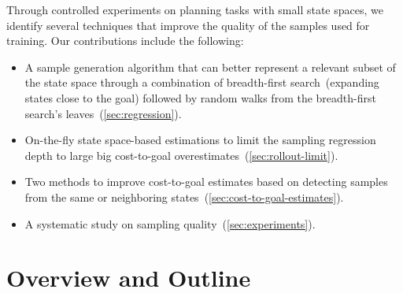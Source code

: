 Through controlled experiments on planning tasks with small state spaces, we identify several techniques that improve the quality of the samples used for training. Our contributions include the following:

\begin{itemize}
    \item A sample generation algorithm that can better represent a relevant subset of the state space through a combination of breadth-first search~(expanding states close to the goal) followed by random walks from the breadth-first search's leaves~(\cref{sec:regression}).
    \item On-the-fly state space-based estimations to limit the sampling regression depth to large big cost-to-goal overestimates~(\cref{sec:rollout-limit}).
    \item Two methods to improve cost-to-goal estimates based on detecting samples from the same or neighboring states~(\cref{sec:cost-to-goal-estimates}).
    \item A systematic study on sampling quality~(\cref{sec:experiments}).
\end{itemize}

\section{Overview and Outline}
\label{sec:outline}

